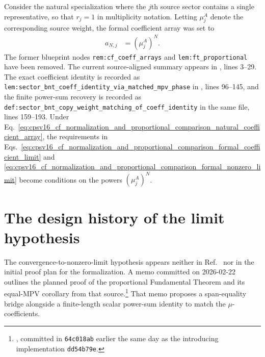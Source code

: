 \documentclass{article}
\begin{document}
Consider the natural specialization where the $j$th source sector contains a
single representative, so that $r_j=1$ in multiplicity notation. Letting
$\mu_j^A$ denote the corresponding source weight, the formal coefficient array
was set to
\begin{align}
    a_{N,j}
        &= (\mu_j^A)^N.
    \label{eq:cpsv16_cf_normalization_and_proportional_comparison_natural_coefficient_array}
\end{align}
The former blueprint nodes \texttt{rem:cf\_coeff\_arrays} and
\texttt{lem:ft\_proportional} have been removed. The current source-aligned
summary appears in
, lines 3--29.
The exact coefficient identity is recorded as
\texttt{lem:sector\_bnt\_coeff\_identity\_via\_matched\_mpv\_phase} in
, lines 96--145,
and the finite power-sum recovery is recorded as
\texttt{def:sector\_bnt\_copy\_weight\_matching\_of\_coeff\_identity} in the
same file, lines 159--193. Under
Eq.~\ref{eq:cpsv16_cf_normalization_and_proportional_comparison_natural_coefficient_array},
the requirements in
Eqs.~\ref{eq:cpsv16_cf_normalization_and_proportional_comparison_formal_coefficient_limit}
and
\ref{eq:cpsv16_cf_normalization_and_proportional_comparison_formal_nonzero_limit}
become conditions on the powers $(\mu_j^A)^N$.

\section{The design history of the limit hypothesis}

The convergence-to-nonzero-limit hypothesis appears neither in
Ref.~\cite{Cirac2016MPDO_arXiv} nor in the initial proof plan for the
formalization. A memo committed on 2026-02-22 outlines the planned proof of the
proportional Fundamental Theorem and its equal-MPV corollary from that
source.\footnote{%
    , committed in
    \texttt{64c018ab} earlier the same day as the introducing implementation
    \texttt{dd54b79e}.}
That memo proposes a span-equality bridge alongside a finite-length scalar
power-sum identity to match the $\mu$-coefficients.
\end{document}
